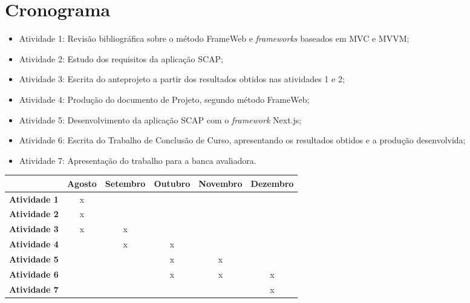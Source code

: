 \section{Cronograma}
\label{sec-intro-crono}


\begin{itemize}
\item Atividade 1: Revisão bibliográfica sobre o método FrameWeb e \textit{frameworks} baseados em MVC e MVVM;
\item Atividade 2: Estudo dos requisitos da aplicação SCAP;
\item Atividade 3: Escrita do anteprojeto a partir dos resultados obtidos nas atividades 1 e 2;
\item Atividade 4: Produção do documento de Projeto, segundo método FrameWeb;
\item Atividade 5: Desenvolvimento da aplicação SCAP com o \textit{framework} Next.js;
\item Atividade 6: Escrita do Trabalho de Conclusão de Curso, apresentando os resultados obtidos e a produção desenvolvida;
\item Atividade 7: Apresentação do trabalho para a banca avaliadora.
\end{itemize}

\begin{table}[h]
\centering
\begin{tabular}{c|c|c|c|c|c|}
\cline{2-6}
\multicolumn{1}{l|}{} & \textbf{Agosto} & \textbf{Setembro} & \textbf{Outubro} & \textbf{Novembro} & \textbf{Dezembro} \\ \hline
\multicolumn{1}{|c|}{\textbf{Atividade 1}} & x &   &   &   &   \\ \hline
\multicolumn{1}{|c|}{\textbf{Atividade 2}} & x &   &   &   &   \\ \hline
\multicolumn{1}{|c|}{\textbf{Atividade 3}} & x & x &   &   &   \\ \hline
\multicolumn{1}{|c|}{\textbf{Atividade 4}} &   & x & x &   &   \\ \hline
\multicolumn{1}{|c|}{\textbf{Atividade 5}} &   &   & x & x &   \\ \hline
\multicolumn{1}{|c|}{\textbf{Atividade 6}} &   &   & x & x & x \\ \hline
\multicolumn{1}{|c|}{\textbf{Atividade 7}} &   &   &   &   & x \\ \hline
\end{tabular}
\end{table}